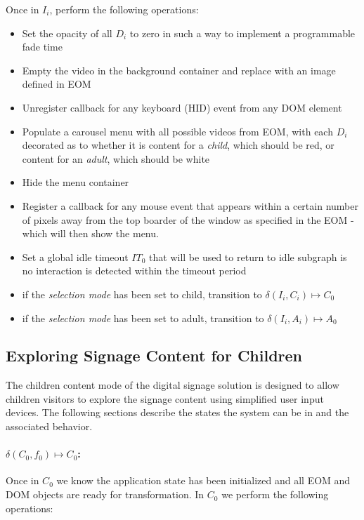 \documentclass[10pt]{article}
\begin{document}
Once in $I_{i}$, perform the following operations:

\begin{itemize}
	\item Set the opacity of all $D_{i}$ to zero in such a way to implement a programmable fade time
	\item Empty the video in the background container and replace with an image defined in EOM
	\item Unregister callback for any keyboard (HID) event from any DOM element
	\item Populate a carousel menu with all possible videos from EOM, with each $D_{i}$ decorated as to whether it is content for a \emph{child\/}, which should be red, or content for an \emph{adult\/}, which should be white
	\item Hide the menu container
	\item Register a callback for any mouse event that appears within a certain number of pixels away from the top boarder of the window as specified in the EOM - which will then show the menu. 
	\item Set a global idle timeout $IT_{0}$ that will be used to return to idle subgraph is no interaction is detected within the timeout period
	\item if the \emph{selection mode\/} has been set to child, transition to $\delta(I_{i}, C_{i}) \mapsto C_{0}$
	\item if the \emph{selection mode\/} has been set to adult, transition to $\delta(I_{i}, A_{i}) \mapsto A_{0}$
\end{itemize}

\subsection{Exploring Signage Content for Children}

The children content mode of the digital signage solution is designed to allow children visitors to explore the signage content using simplified user input devices. The following sections describe the states the system can be in and the associated behavior.

\paragraph{$\delta(C_{0}, f_{0}) \mapsto C_{0}$:}

Once in $C_{0}$ we know the application state has been initialized and all EOM and DOM objects are ready for transformation. In $C_{0}$ we perform the following operations:
\end{document}
